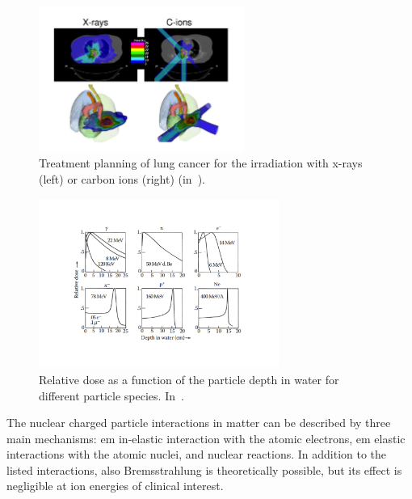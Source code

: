 \begin{figure}[!htbp]
\centering
\includegraphics[width=0.6\textwidth]{03_GraphicFiles/chapter1_Introduction/xRayCions_fields.pdf}
\caption{Treatment planning of lung cancer for the irradiation with x-rays (left) or carbon ions (right) (in~\cite{Durante2016}).}
\label{chap1::fig::XraysCionsFields}
\end{figure} 

\begin{figure}[!htbp]
\centering
\includegraphics[width=0.7\textwidth , trim={0 0.3cm 0 0.3cm}, clip=true]{03_GraphicFiles/chapter1_Introduction/depth_doseProf_multipleIMG.pdf}
\caption{Relative dose as a function of the particle depth in water for different particle species. In~\cite{PaganettiBook2012}.}
\label{chap1::fig::Depth-doseProf}
\end{figure} 

The nuclear charged particle interactions in matter can be described by three main mechanisms: \gls{em} in-elastic interaction with the atomic electrons, \gls{em} elastic interactions with the atomic nuclei, and nuclear reactions. In addition to the listed interactions, also Bremsstrahlung is theoretically possible, but its effect is negligible at ion energies of clinical interest. 

